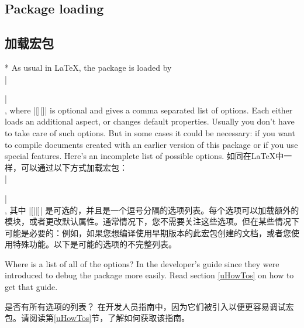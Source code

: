 
\begin{paracol}{2}


\subsection{Package loading}\label{uPackageLoading}
\switchcolumn
\subsection{加载宏包}
\switchcolumn[0]*%
As usual in \LaTeX, the package is loaded by\\
   |\usepackage[||]{listings}|\\,
where |[||]| is optional and gives a comma separated list of
options. Each either loads an additional  aspect, or
changes default properties. Usually you don't have to take care of such
options. But in some cases it could be necessary: if you want to compile
documents created with an earlier version of this package or if you use
special features. Here's an incomplete list of possible options.
\switchcolumn
如同在\LaTeX 中一样，可以通过以下方式加载宏包：\\
|\usepackage[||]{listings}|\\,
其中 |[||]| 是可选的，并且是一个逗号分隔的选项列表。每个选项可以加载额外的模块，或者更改默认属性。通常情况下，您不需要关注这些选项。但在某些情况下可能是必要的：例如，如果您想编译使用早期版本的此宏包创建的文档，或者您使用特殊功能。以下是可能的选项的不完整列表。
\end{paracol}
\begin{advise}
    \begin{paracol}{2}
\item Where is a list of all of the options?
      \advisespace
      In the developer's guide since they were introduced to debug the
      package more easily. Read section \ref{uHowTos} on how to get that
      guide.
\switchcolumn
\item 是否有所有选项的列表？
\advisespace
在开发人员指南中，因为它们被引入以便更容易调试宏包。请阅读第\ref{uHowTos}节，了解如何获取该指南。
    \end{paracol}

\end{advise}

